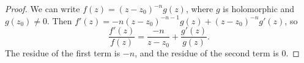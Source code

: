 \begin{proof}
We can write $f(z) = (z-z_0)^{-n} g(z)$, where $g$ is holomorphic and $g(z_0) \neq 0$.
Then $f'(z) = -n(z-z_0)^{-n-1} g(z) + (z-z_0)^{-n} g'(z)$, so
$$
\frac{f'(z)}{f(z)} = \frac{-n}{z-z_0} + \frac{g'(z)}{g(z)}.
$$
The residue of the first term is $-n$, and the residue of the second term is $0$.
\end{proof}


